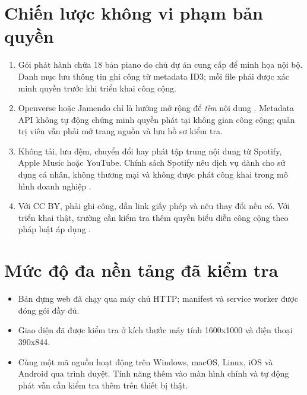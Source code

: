 \documentclass[12pt,a4paper,twoside,openright]{report}
\begin{document}
\section{Chiến lược không vi phạm bản quyền}
\begin{enumerate}
  \item Gói phát hành chứa 18 bản piano do chủ dự án cung cấp để minh họa nội bộ. Danh mục lưu
  thông tin ghi công từ metadata ID3; mỗi file phải được xác minh quyền trước khi triển khai công cộng.
  \item Openverse hoặc Jamendo chỉ là hướng mở rộng để \emph{tìm} nội dung \cite{openverse}. Metadata API
  không tự động chứng minh quyền phát tại không gian công cộng; quản trị viên vẫn phải mở
  trang nguồn và lưu hồ sơ kiểm tra.
  \item Không tải, lưu đệm, chuyển đổi hay phát tập trung nội dung từ Spotify, Apple Music hoặc
  YouTube. Chính sách Spotify nêu dịch vụ dành cho sử dụng cá nhân, không thương mại và
  không được phát công khai trong mô hình doanh nghiệp \cite{spotify}.
  \item Với CC BY, phải ghi công, dẫn link giấy phép và nêu thay đổi nếu có. Với triển khai thật,
  trường cần kiểm tra thêm quyền biểu diễn công cộng theo pháp luật áp dụng \cite{cclicenses}.
\end{enumerate}

\begin{center}
\end{center}

\section{Mức độ đa nền tảng đã kiểm tra}
\begin{itemize}
  \item Bản dựng web đã chạy qua máy chủ HTTP; manifest và service worker được đóng gói đầy đủ.
  \item Giao diện đã được kiểm tra ở kích thước máy tính 1600x1000 và điện thoại 390x844.
  \item Cùng một mã nguồn hoạt động trên Windows, macOS, Linux, iOS và Android qua trình
  duyệt. Tính năng thêm vào màn hình chính và tự động phát vẫn cần kiểm tra thêm trên thiết bị thật.
\end{itemize}
\end{document}
